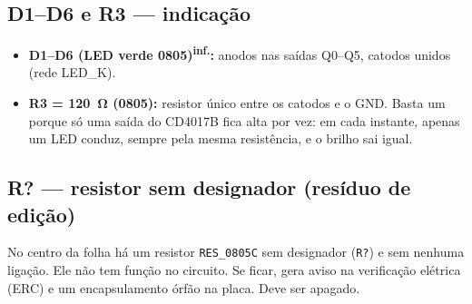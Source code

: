 \documentclass[11pt,a4paper]{article}
\newcommand{\inferido}{\textsuperscript{\textcolor{douradoEsc}{\sffamily inf.}}}
\begin{document}
\subsection{D1–D6 e R3 — indicação}
\begin{itemize}
  \item \textbf{D1–D6 (LED verde 0805)\inferido:} anodos nas saídas Q0–Q5, catodos
  unidos (rede LED\_K). \DSled
  \item \textbf{R3 = \SI{120}{\ohm} (0805):} resistor único entre os catodos e o GND.
  Basta um porque só uma saída do CD4017B fica alta por vez: em cada instante, apenas um
  LED conduz, sempre pela mesma resistência, e o brilho sai igual.
\end{itemize}

\subsection{R? — resistor sem designador (resíduo de edição)}
No centro da folha há um resistor \texttt{RES\_0805C} sem designador (\texttt{R?}) e sem
nenhuma ligação. Ele não tem função no circuito. Se ficar, gera aviso na verificação
elétrica (ERC) e um encapsulamento órfão na placa. Deve ser apagado.

\end{document}
